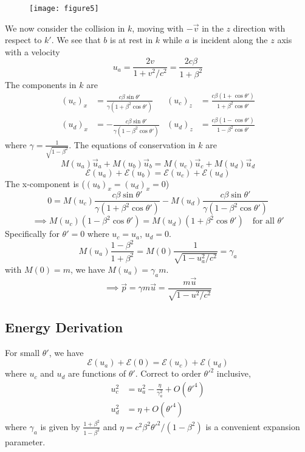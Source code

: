 \documentclass{article}
\begin{document}
	\begin{figure}[h]
		\centering
		\texttt{[image: figure5]}
		\caption{}
		\label{fig:figure5}
	\end{figure}
	
	We now consider the collision in $k$, moving with $-\vec{v}$ in the $z$ direction with respect to $k'$.
	We see that $b$ is at rest in $k$ while $a$ is incident along the $z$ axis with a velocity
	\[ u_a = \frac{2v}{1+v^2/c^2} = \frac{2c\beta}{1+\beta^2} \]
	The components in $k$ are
	\begin{align*}
		(u_c)_x &= \frac{c\beta\sin\theta'}{\gamma(1+\beta^2\cos\theta')} & (u_c)_z &= \frac{c\beta(1+\cos\theta')}{1+\beta^2\cos\theta'} \\
		(u_d)_x &= -\frac{c\beta\sin\theta'}{\gamma(1-\beta^2\cos\theta')} & (u_d)_z &= \frac{c\beta(1-\cos\theta')}{1-\beta^2\cos\theta'}
	\end{align*}
	where $\gamma = \frac{1}{\sqrt{1-\beta^2}}$.
	The equations of conservation in $k$ are
	\[ M(u_a)\vec{u}_a + M(u_b)\vec{u}_b = M(u_c)\vec{u}_c + M(u_d)\vec{u}_d \]
	\[ \mathcal{E}(u_a) + \mathcal{E}(u_b) = \mathcal{E}(u_c) + \mathcal{E}(u_d) \]
	The x-component is ($(u_b)_x = (u_d)_x = 0$)
	\[ 0 = M(u_c)\frac{c\beta\sin\theta'}{\gamma(1+\beta^2\cos\theta')} - M(u_d)\frac{c\beta\sin\theta'}{\gamma(1-\beta^2\cos\theta')} \]
	\[ \implies M(u_c)(1-\beta^2\cos\theta') = M(u_d)(1+\beta^2\cos\theta') \quad \text{for all } \theta' \]
	Specifically for $\theta' = 0$ where $u_c = u_a$, $u_d=0$.
	\[ M(u_a)\frac{1-\beta^2}{1+\beta^2} = M(0)\frac{1}{\sqrt{1-u_a^2/c^2}} = \gamma_a \]
	with $M(0)=m$, we have $M(u_a) = \gamma_a m$.
	\[ \implies \vec{p} = \gamma m \vec{u} = \frac{m\vec{u}}{\sqrt{1-u^2/c^2}} \]
	
	\subsection*{Energy Derivation}
	For small $\theta'$, we have
	\[ \mathcal{E}(u_a) + \mathcal{E}(0) = \mathcal{E}(u_c) + \mathcal{E}(u_d) \]
	where $u_c$ and $u_d$ are functions of $\theta'$.
	Correct to order $\theta'^2$ inclusive,
	\begin{align*}
		u_c^2 &= u_a^2 - \frac{\eta}{\gamma_a^2} + O(\theta'^4) \\
		u_d^2 &= \eta + O(\theta'^4)
	\end{align*}
	where $\gamma_a$ is given by $\frac{1+\beta^2}{1-\beta^2}$ and $\eta = c^2 \beta^2 \theta'^2 / (1-\beta^2)$ is a convenient expansion parameter.
	
\end{document}
